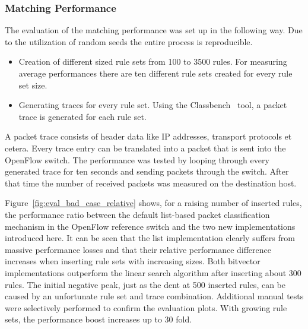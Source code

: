 \documentclass[conference]{IEEEtran}
\begin{document}
\subsubsection{Matching Performance}
The evaluation of the matching performance was set up in the following way.
Due to the utilization of random seeds the entire process is reproducible.
\begin{itemize}
    \item Creation of different sized rule sets from 100 to 3500 rules.
        For measuring average performances there are ten different rule sets created for every rule set size.
    \item Generating traces for every rule set.
        Using the Classbench~\cite{classbench_website} tool, a packet trace is generated for each rule set.
\end{itemize}

A packet trace consists of header data like IP addresses, transport protocols et cetera.
Every trace entry can be translated into a packet that is sent into the OpenFlow switch.
The performance was tested by looping through every generated trace for ten seconds and sending packets through the switch.
After that time the number of received packets was measured on the destination host.

Figure~\ref{fig:eval_bad_case_relative} shows, for a raising number of inserted rules,
the performance ratio between the default list-based packet classification mechanism in
the OpenFlow reference switch and the two new implementations introduced here.
It can be seen that the list implementation
clearly suffers from massive performance losses and that their relative 
performance difference increases when inserting rule sets with increasing sizes.
Both bitvector implementations outperform the linear search algorithm after inserting about 300 rules.
The initial negative peak, just as the dent at 500 inserted rules, can be caused by an unfortunate rule set and trace combination.
Additional manual tests were selectively performed to confirm the evaluation plots.
With growing rule sets, the performance boost increases up to 30 fold.
\end{document}
